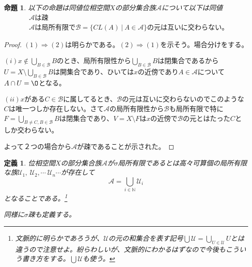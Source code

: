 \documentclass[leqno]{jsarticle}
\newtheorem{prop}[thm]{命題}
\newtheorem{df}[thm]{定義}
\newcommand{\To}{\Longrightarrow}
\newcommand{\nn}{\mathbb{N}}
\newcommand{\dpst}{\displaystyle}
\begin{document}
\begin{prop}
以下の命題は同値位相空間$X$の部分集合族$\mathcal{A}$について以下は同値
\begin{align}
&\mbox{$\mathcal{A}$は疎}\\
&\mbox{$\mathcal{A}$は局所有限で$\mathcal{B}=\{CL(A)\ |\ A\in \mathcal{A}\}$の元は互いに交わらない。}
\end{align}
\end{prop}
\setcounter{equation}{0}
\begin{proof}
$(1)\To(2)$は明らかである。$(2)\To(1)$を示そう。場合分けをする。\par
$(i) \dpst x\notin \bigcup_{B\in \mathcal{B}}B$のとき、局所有限性から$\bigcup_{B\in \mathcal{B}}B$は閉集合であるから$\dpst U=X\setminus \bigcup_{B\in \mathcal{B}}B$は開集合であり、ひいては$x$の近傍であり$A\in \mathcal{A}$について$A\cap U=\O$となる。\par 
$(ii) x$がある$C\in \mathcal{B}$に属してるとき、$\mathcal{B}$の元は互いに交わらないのでこのような$C$は唯一つしか存在しない。さて$\mathcal{A}$の局所有限性から$\mathcal{B}$も局所有限で特に$\dpst F=\bigcup_{B\neq C,B\in \mathcal{B}}B$は閉集合であり、$V=X\setminus F$は$x$の近傍で$\mathcal{B}$の元とはたった$C$としか交わらない。\par
よって２つの場合から$\mathcal{A}$が疎であることが示された。
\end{proof}
\begin{df}
位相空間$X$の部分集合族$\mathcal{A}$が$\sigma$局所有限であるとは高々可算個の局所有限な族$\mathcal{U}_1,\ \mathcal{U}_2,\cdots\ \mathcal{U}_n\cdots$が存在して
\[
\mathcal{A}=\bigcup_{i\in \nn}\mathcal{U}_i
\]
となることである。\footnote{文脈的に明らかであろうが、$\mathcal{U}$の元の和集合を表す記号$\dpst \bigcup\mathcal{U}=\bigcup_{U\in \mathcal{U}}U$とは違うので注意せよ。紛らわしいが、文脈的にわかるはずなので今後もこういう書き方をする。$\bigcup\mathcal{U}$も使う。}\par
同様に$\sigma$疎も定義する。
\end{df}
\end{document}
